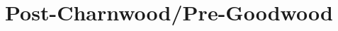 \documentclass[noraggedright]{turabian-researchpaper}
\begin{document}
%
%
%
%
%
%
%
%
%
%
%
%
%
%
%
%
%
%
%
%

\section{Post-Charnwood/Pre-Goodwood}
\end{document}

